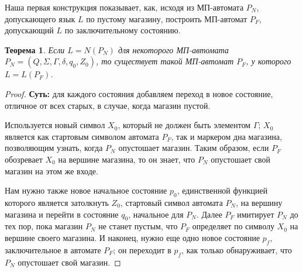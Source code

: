 \documentclass[a4paper,12pt]{article}
\newtheorem*{theorem}{Теорема}
\begin{document}
Наша первая конструкция показывает, как, исходя из МП-автомата \(P_N\), допускающего язык \(L\) по пустому магазину, построить МП-автомат \(P_F\), допускающий \(L\) по заключительному состоянию.
\begin{theorem}
	Если \(L = N(P_N)\) для некоторого МП-автомата \(P_N = (Q, \Sigma, \Gamma, \delta, q_0, Z_0)\), то существует такой МП-автомат \(P_F\), у которого \(L = L(P_F)\).
\end{theorem}
\begin{proof}
	\textbf{Суть:} для каждого состояния добавляем переход в новое состояние, отличное от всех старых, в случае, когда магазин пустой.
	
	Используется новый символ \(X_0\), который не должен быть элементом \(\Gamma\); \(X_0\) является как стартовым символом автомата \(P_F\), так и маркером дна магазина, позволяющим узнать, когда \(P_N\) опустошает магазин. Таким образом, если \(P_F\) обозревает \(X_0\) на вершине магазина, то он знает, что \(P_N\) опустошает свой магазин на этом же входе.
	
	Нам нужно также новое начальное состояние \(p_0\), единственной функцией которого является затолкнуть \(Z_0\), стартовый символ автомата \(P_N\), на вершину магазина и перейти в состояние \(q_0\), начальное для \(P_N\). Далее \(P_F\) имитирует \(P_N\) до тех пор, пока магазин \(P_N\) не станет пустым, что \(P_F\) определяет по символу \(X_0\) на вершине своего магазина. И наконец, нужно еще одно новое состояние \(p_f\), заключительное в автомате \(P_F\); он переходит в \(p_f\), как только обнаруживает, что \(P_N\) опустошает свой магазин.
	

\end{proof}
\end{document}
